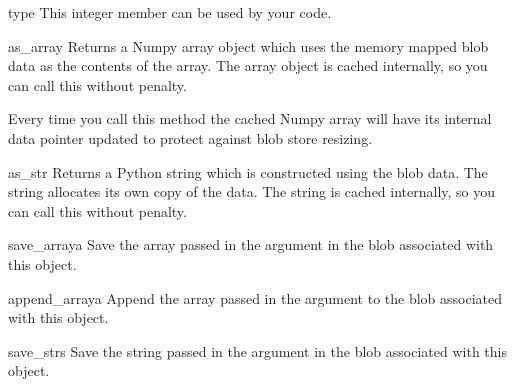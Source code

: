\begin{memberdesc}[Blob]{type}
This integer member can be used by your code.
\end{memberdesc}

\begin{methoddesc}[Blob]{as_array}{}
Returns a Numpy array object which uses the memory mapped blob data as
the contents of the array.  The array object is cached internally, so
you can call this without penalty.

Every time you call this method the cached Numpy array will have its
internal data pointer updated to protect against blob store resizing.
\end{methoddesc}

\begin{methoddesc}[Blob]{as_str}{}
Returns a Python string which is constructed using the blob data.  The
string allocates its own copy of the data.  The string is cached
internally, so you can call this without penalty.
\end{methoddesc}

\begin{methoddesc}[Blob]{save_array}{a}
Save the array passed in the  argument in the blob associated
with this object.
\end{methoddesc}

\begin{methoddesc}[Blob]{append_array}{a}
Append the array passed in the  argument to the blob associated
with this object.
\end{methoddesc}

\begin{methoddesc}[Blob]{save_str}{s}
Save the string passed in the  argument in the blob associated
with this object.
\end{methoddesc}
